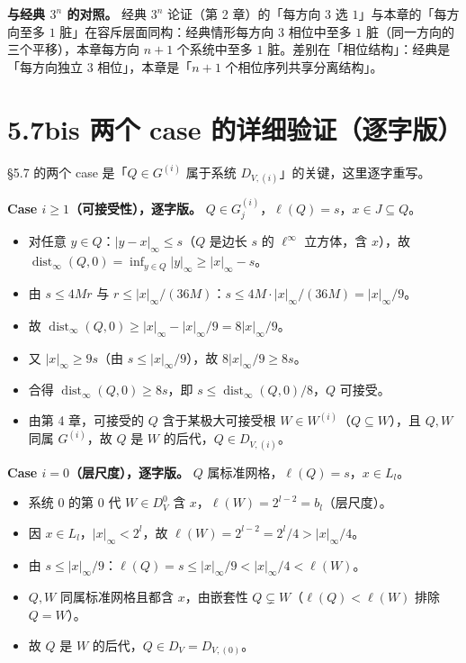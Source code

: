 \documentclass[a4paper,11pt,openany]{ctexbook}
\numberwithin{equation}{chapter}
\numberwithin{figure}{chapter}
\numberwithin{table}{chapter}
\begin{document}
\textbf{与经典 $3^n$ 的对照。} 经典 $3^n$ 论证（第 2 章）的「每方向 $3$ 选 $1$」与本章的「每方向至多 $1$ 脏」在容斥层面同构：经典情形每方向 $3$ 相位中至多 $1$ 脏（同一方向的三个平移），本章每方向 $n+1$ 个系统中至多 $1$ 脏。差别在「相位结构」：经典是「每方向独立 $3$ 相位」，本章是「$n+1$ 个相位序列共享分离结构」。

\section{5.7bis 两个 case 的详细验证（逐字版）}

§5.7 的两个 case 是「$Q\in G^{(i)}$ 属于系统 $D_{V,(i)}$」的关键，这里逐字重写。

\textbf{Case $i\ge1$（可接受性），逐字版。} $Q\in G_j^{(i)}$，$\ell(Q)=s$，$x\in J\subseteq Q$。

\begin{itemize}
\item 对任意 $y\in Q$：$|y-x|_\infty\le s$（$Q$ 是边长 $s$ 的 $\ell^\infty$ 立方体，含 $x$），故 $\operatorname{dist}_\infty(Q,0)=\inf_{y\in Q}|y|_\infty\ge|x|_\infty-s$。
\item 由 $s\le4Mr$ 与 $r\le|x|_\infty/(36M)$：$s\le4M\cdot|x|_\infty/(36M)=|x|_\infty/9$。
\item 故 $\operatorname{dist}_\infty(Q,0)\ge|x|_\infty-|x|_\infty/9=8|x|_\infty/9$。
\item 又 $|x|_\infty\ge9s$（由 $s\le|x|_\infty/9$），故 $8|x|_\infty/9\ge8s$。
\item 合得 $\operatorname{dist}_\infty(Q,0)\ge8s$，即 $s\le\operatorname{dist}_\infty(Q,0)/8$，$Q$ 可接受。
\item 由第 4 章，可接受的 $Q$ 含于某极大可接受根 $W\in W^{(i)}$（$Q\subseteq W$），且 $Q,W$ 同属 $G^{(i)}$，故 $Q$ 是 $W$ 的后代，$Q\in D_{V,(i)}$。
\end{itemize}

\textbf{Case $i=0$（层尺度），逐字版。} $Q$ 属标准网格，$\ell(Q)=s$，$x\in L_l$。

\begin{itemize}
\item 系统 0 的第 0 代 $W\in D_V^0$ 含 $x$，$\ell(W)=2^{l-2}=b_l$（层尺度）。
\item 因 $x\in L_l$，$|x|_\infty<2^l$，故 $\ell(W)=2^{l-2}=2^l/4>|x|_\infty/4$。
\item 由 $s\le|x|_\infty/9$：$\ell(Q)=s\le|x|_\infty/9<|x|_\infty/4<\ell(W)$。
\item $Q,W$ 同属标准网格且都含 $x$，由嵌套性 $Q\subsetneq W$（$\ell(Q)<\ell(W)$ 排除 $Q=W$）。
\item 故 $Q$ 是 $W$ 的后代，$Q\in D_V=D_{V,(0)}$。
\end{itemize}
\end{document}
